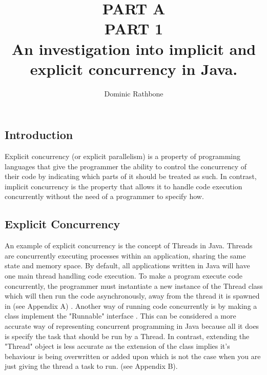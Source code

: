 \documentclass[]{report}
\title{PART A \\ PART 1 \\ An investigation into implicit and explicit concurrency in Java.}
\author{Dominic Rathbone}
\begin{document}
\maketitle

\subsection{Introduction}
Explicit concurrency (or explicit parallelism) is a property of programming languages that give the programmer the ability to control the concurrency of their code by indicating which parts of it should be treated as such. In contrast, implicit concurrency is the property that allows it to handle code execution concurrently without the need of a programmer to specify how.

\subsection{Explicit Concurrency}
An example of explicit concurrency is the concept of Threads in Java. Threads are concurrently executing processes within an application, sharing the same state and memory space. By default, all applications written in Java will have one main thread handling code execution. To make a program execute code concurrently, the programmer must instantiate a new instance of the Thread class which will then run the code asynchronously, away from the thread it is spawned in (see Appendix A)  \cite{Threading}. Another way of running code concurrently is by making a class implement the "Runnable" interface \cite{Threading}. This can be considered a more accurate way of representing concurrent programming in Java because all it does is specify the task that should be run by a Thread. In contrast, extending the "Thread" object is less accurate as the extension of the class implies it's behaviour is being overwritten or added upon which is not the case when you are just giving the thread a task to run. (see Appendix B).
\end{document}
